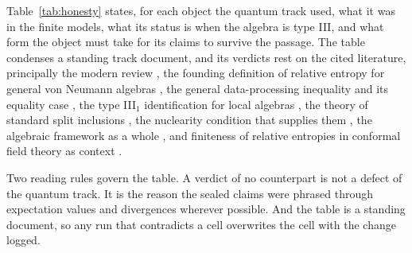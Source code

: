 \documentclass[aps,prd,reprint,nofootinbib,longbibliography]{revtex4-2}
\begin{document}
Table~\ref{tab:honesty} states, for each object the quantum track used,
what it was in the finite models, what its status is when the algebra is
type III, and what form the object must take for its claims to survive
the passage.  The table condenses a standing track document, and its
verdicts rest on the cited literature, principally the modern review
\cite{Witten2018}, the founding definition of relative entropy for
general von Neumann algebras \cite{Araki1976}, the general
data-processing inequality \cite{Uhlmann1977} and its equality case
\cite{Petz1986}, the type III$_{1}$ identification for local algebras
\cite{Fredenhagen1985}, the theory of standard split inclusions
\cite{DoplicherLongo1984}, the nuclearity condition that supplies them
\cite{BuchholzWichmann1986}, the algebraic framework as a whole
\cite{Haag1996}, and finiteness of relative entropies in conformal field
theory as context \cite{Lashkari2014}.

Two reading rules govern the table.  A verdict of no counterpart is not a
defect of the quantum track.  It is the reason the sealed claims were
phrased through expectation values and divergences wherever possible.
And the table is a standing document, so any run that contradicts a cell
overwrites the cell with the change logged.
\end{document}
